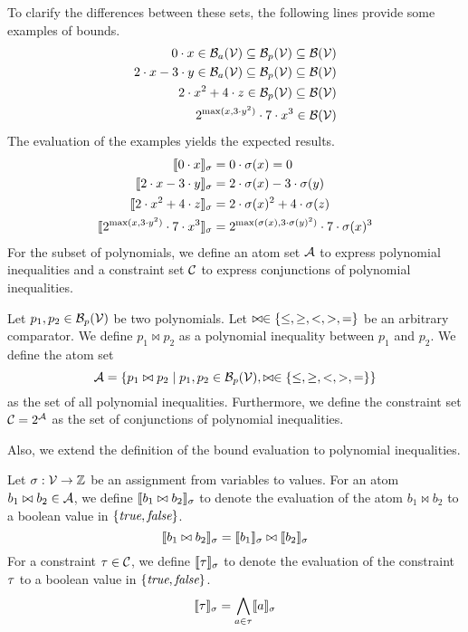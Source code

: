 To clarify the differences between these sets, the following lines provide some examples of bounds.
\begin{align*}
  0 \cdot x \in \mathcal{B}_a(\mathcal{V}) \subseteq \mathcal{B}_p(\mathcal{V}) \subseteq \mathcal{B}(\mathcal{V}) \\
  2 \cdot x - 3 \cdot y \in \mathcal{B}_a(\mathcal{V}) \subseteq \mathcal{B}_p(\mathcal{V}) \subseteq \mathcal{B}(\mathcal{V}) \\
  2 \cdot x^2 + 4 \cdot z \in \mathcal{B}_p(\mathcal{V}) \subseteq \mathcal{B}(\mathcal{V}) \\
  2^{\max(x,3 \cdot y^2)} \cdot 7 \cdot x^3 \in \mathcal{B}(\mathcal{V})
\end{align*}
The evaluation of the examples yields the expected results.
\begin{align*}
  \llbracket 0 \cdot x \rrbracket_{\sigma} &= 0 \cdot \sigma(x) = 0 \\
  \llbracket 2 \cdot x - 3 \cdot y \rrbracket_{\sigma} &= 2 \cdot \sigma(x) - 3 \cdot \sigma(y) \\
  \llbracket 2 \cdot x^2 + 4 \cdot z \rrbracket_{\sigma} &= 2 \cdot \sigma(x)^2 + 4 \cdot \sigma(z) \\
  \llbracket 2^{\max(x,3 \cdot y^2)} \cdot 7 \cdot x^3 \rrbracket_{\sigma} &= 2^{\max(\sigma(x),3 \cdot \sigma(y)^2)} \cdot 7 \cdot \sigma(x)^3
\end{align*}
For the subset of polynomials, we define an atom set $\mathcal{A}$ to express polynomial inequalities and a constraint set $\mathcal{C}$ to express conjunctions of polynomial inequalities.

\begin{definition}
  Let $p_1, p_2 \in \mathcal{B}_p(\mathcal{V})$ be two polynomials.
  Let $\bowtie \in \lbrace \leq, \geq, <, >, = \rbrace$ be an arbitrary comparator.
  We define $p_1 \bowtie p_2$ as a polynomial inequality between $p_1$ and $p_2$.
  We define the atom set
  \[ \mathcal{A} = \left\{ p_1 \bowtie p_2 \mid p_1, p_2 \in \mathcal{B}_p(\mathcal{V}), \bowtie \in \lbrace \leq, \geq, <, >, = \rbrace \right\} \]
  as the set of all polynomial inequalities.
  Furthermore, we define the constraint set $\mathcal{C} = 2^{\mathcal{A}}$ as the set of conjunctions of polynomial inequalities.
\end{definition}
Also, we extend the definition of the bound evaluation to polynomial inequalities.

\begin{definition}
  Let $\sigma: \mathcal{V} \rightarrow \mathbb{Z}$ be an assignment from variables to values.
  For an atom $b_1 \bowtie b_2 \in \mathcal{A}$, we define $\llbracket b_1 \bowtie b_2 \rrbracket_{\sigma}$ to denote the evaluation of the atom $b_1 \bowtie b_2$ to a boolean value in $\lbrace \emph{true}, \emph{false} \rbrace$.
  \[ \llbracket b_1 \bowtie b_2 \rrbracket_{\sigma} = \llbracket b_1 \rrbracket_{\sigma} \bowtie \llbracket b_2 \rrbracket_{\sigma} \]
  For a constraint $\tau \in \mathcal{C}$, we define $\llbracket \tau \rrbracket_{\sigma}$ to denote the evaluation of the constraint $\tau$ to a boolean value in $\lbrace \emph{true}, \emph{false} \rbrace$.
  \[ \llbracket \tau \rrbracket_{\sigma} = \bigwedge_{a \in \tau} \llbracket a \rrbracket_{\sigma} \]
\end{definition}
